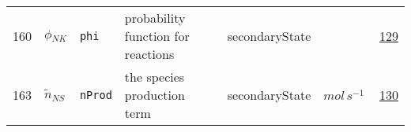 \begin{longtable}{|p{1cm}|p{2.5cm}|p{4.5cm}|p{8cm}|p{3.0cm}|p{3cm}|p{1cm}|}
                 \\
            160
             & \hypertarget{"v:160"}{ $ {\phi}{_{{N K}}} $}
             & \verb|phi|
             & probability function for reactions
             & \begin{lay}secondaryState \end{lay}
             & $  $
             &                 \hyperlink{"e:129"}{ 129 }
                 \\
            163
             & \hypertarget{"v:163"}{ $ {\tilde{n}}{_{{N S}}} $}
             & \verb|nProd|
             & the species production term
             & \begin{lay}secondaryState \end{lay}
             & $ mol \,s^{-1} \, $
             &                 \hyperlink{"e:130"}{ 130 }
                 \\
    \end{longtable}